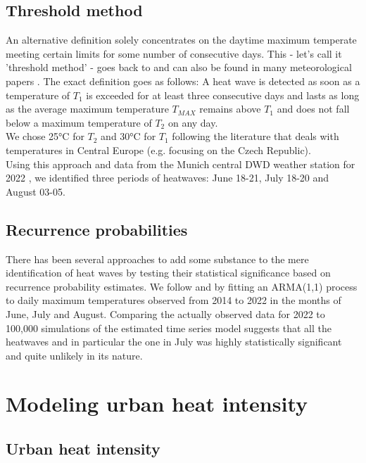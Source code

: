 \documentclass[12pt]{article}
\begin{document}
\subsection{Threshold method}

An alternative definition solely concentrates on the daytime maximum temperate meeting certain limits for some number of consecutive days. This - let's call it 'threshold method' - goes back to \citet{huth2000} and can also be found in many meteorological papers \citep{meehl2004,kysely2004,kysely2010}. The exact definition goes as follows: A heat wave is detected as soon as a temperature of $T_1$ is exceeded for at least three consecutive days and lasts as long as the average maximum temperature $T_{MAX}$ remains above $T_1$ and does not fall below a maximum temperature of $T_2$ on any day. \\
We chose 25°C for $T_2$ and 30°C for $T_1$ following the literature that deals with temperatures in Central Europe (e.g. \citet{kysely2004} focusing on the Czech Republic). \\
Using this approach and data from the Munich central DWD weather station for 2022 , we identified three periods of heatwaves: June 18-21, July 18-20 and August 03-05.

\subsection{Recurrence probabilities}

There has been several approaches to add some substance to the mere identification of heat waves by testing their statistical significance based on recurrence probability estimates. We follow \citet{mearns1984} and \citet{kysely2010} by fitting an ARMA(1,1) process to daily maximum temperatures observed from 2014 to 2022 in the months of June, July and August. Comparing the actually observed data for 2022 to 100,000 simulations of the estimated time series model suggests that all the heatwaves and in particular the one in July was highly statistically significant and quite unlikely in its nature.


\section{Modeling urban heat intensity}

\subsection{Urban heat intensity}
\end{document}
